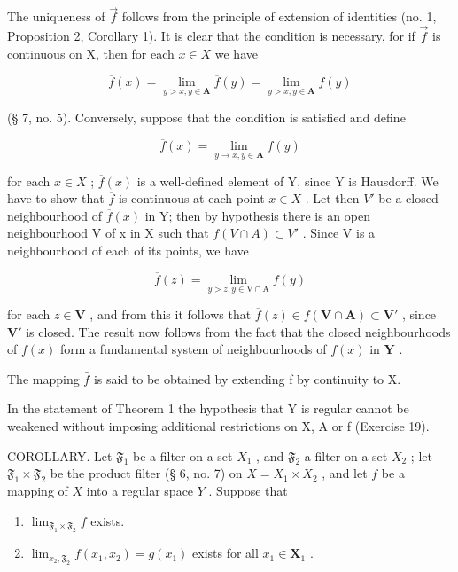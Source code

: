 The uniqueness of \(\vec{f}\) follows from the principle of extension of identities (no. 1, Proposition 2, Corollary 1). It is clear that the condition is necessary, for if \(\vec{f}\) is continuous on X, then for each \(x \in X\) we have

\[
\overline {{f}} (x) = \lim _ {y > x, y \in \mathbf {A}} \overline {{f}} (y) = \lim _ {y > x, y \in \mathbf {A}} f (y)
\]

(§ 7, no. 5). Conversely, suppose that the condition is satisfied and define

\[
\overline {{f}} (x) = \lim _ {y \rightarrow x, y \in \mathbf {A}} f (y)
\]

for each \(x \in X\) ; \(\overline{f}(x)\) is a well-defined element of Y, since Y is Hausdorff. We have to show that \(\overline{f}\) is continuous at each point \(x \in X\) . Let then \(V'\) be a closed neighbourhood of \(\overline{f}(x)\) in Y; then by hypothesis there is an open neighbourhood V of x in X such that \(f(V \cap A) \subset V'\) . Since V is a neighbourhood of each of its points, we have

\[
\overline {{f}} (z) = \lim _ {y > z, y \in \mathrm{V} \cap \mathrm{A}} f (y)
\]

for each \(z \in \mathbf{V}\) , and from this it follows that \(\overline{f}(z) \in f(\mathbf{V} \cap \mathbf{A}) \subset \mathbf{V}'\) , since \(\mathbf{V}'\) is closed. The result now follows from the fact that the closed neighbourhoods of \(f(x)\) form a fundamental system of neighbourhoods of \(f(x)\) in \(\mathbf{Y}\) .

The mapping \(\bar{f}\) is said to be obtained by extending f by continuity to X.

In the statement of Theorem 1 the hypothesis that Y is regular cannot be weakened without imposing additional restrictions on X, A or f (Exercise 19).

COROLLARY. Let \(\mathfrak{F}_1\) be a filter on a set \(X_1\) , and \(\mathfrak{F}_2\) a filter on a set \(X_2\) ; let \(\mathfrak{F}_1 \times \mathfrak{F}_2\) be the product filter (§ 6, no. 7) on \(X = X_1 \times X_2\) , and let \(f\) be a mapping of \(X\) into a regular space \(Y\) . Suppose that

\begin{enumerate}
\def\labelenumi{\alph{enumi})}
\item
  \(\lim_{\mathfrak{F}_1\times \mathfrak{F}_2}f\) exists.
\item
  \(\lim_{x_2, \mathfrak{F}_2} f(x_1, x_2) = g(x_1)\) exists for all \(x_1 \in \mathbf{X}_1\) .
\end{enumerate}

